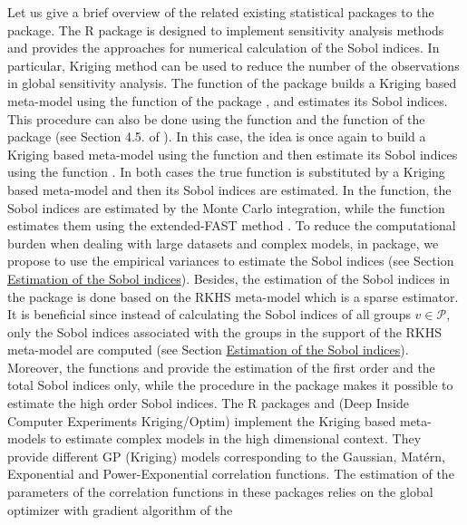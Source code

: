 Let us give a brief overview of the related existing statistical packages to the  package.  
The R package  is designed to implement sensitivity analysis methods and provides the approaches for numerical calculation of the Sobol indices.  
In particular, Kriging method can be used to reduce the number of the observations in global sensitivity analysis. The function  of the package  builds a Kriging based meta-model using the function  of the package  \citep{JSSv051i01}, and estimates its Sobol indices. This procedure can also be done using the function  and the function  of the package  (see Section 4.5. of \citet{JSSv051i01}). In this case, the idea is once again to build a Kriging based meta-model using the function  and then estimate its Sobol indices using the function . In both cases the true function is substituted by a Kriging based meta-model and then its Sobol indices are estimated. 
In the  function, the Sobol indices are estimated by the Monte Carlo integration, while the  function estimates them using the extended-FAST method \citep{doi:10.1080/00401706.1999.10485594}. 
To reduce the computational burden when dealing with large datasets and complex models, in  package, we propose to use the empirical variances to estimate the Sobol indices (see Section \hyperref[subsec:SI]{Estimation of the Sobol indices}).   
Besides, the estimation of the Sobol indices in the  package is done based on the RKHS meta-model which is a sparse estimator. It is beneficial since instead of calculating the Sobol indices of all groups $v\in\mathcal{P}$, only the Sobol indices associated with the groups in the support of the RKHS meta-model are computed (see Section \hyperref[subsec:SI]{Estimation of the Sobol indices}). Moreover, the functions  and  provide the estimation of the first order and the total Sobol indices only, while the procedure in the  package makes it possible to estimate the high order Sobol indices.  
The R packages  and  (Deep Inside Computer Experiments Kriging/Optim) \citep{JSSv051i01} implement the Kriging based meta-models to estimate complex models in the high dimensional context.
They provide different GP (Kriging) models corresponding to the Gaussian, Matérn, Exponential and Power-Exponential correlation functions. 
The estimation of the parameters of the correlation functions in these packages relies on the global optimizer with gradient  algorithm of the
